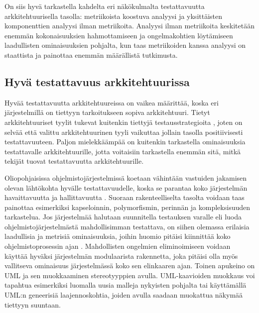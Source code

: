 \documentclass[finnish]{tktltiki2}
\numberwithin{table}{section}
\theoremstyle{definition}
\theoremstyle{remark}
\begin{document}
On siis hyvä tarkastella kahdelta eri näkökulmalta testattavuutta arkkitehtuurisella tasolla: metriikoista koostuva analyysi ja yksittäisten komponenttien analyysi ilman metriikoita. Analyysi ilman metriikoita keskitetään enemmän kokonaisuuksien hahmottamiseen ja ongelmakohtien löytämiseen laadullisten ominaisuuksien pohjalta, kun taas metriikoiden kanssa analyysi on staattista ja painottaa enemmän määrällistä tutkimusta.


\subsection{Hyvä testattavuus arkkitehtuurissa} \label{good_testability}

 
Hyvää testattavuutta arkkitehtuureissa on vaikea määrittää, koska eri järjestelmillä on tiettyyn tarkoitukseen sopiva arkkitehtuuri. Tietyt arkkitehtuuriset tyylit tukevat kuitenkin tiettyjä testausstrategioita \citep{Eickelmann:1996:MOS:243327.243602}, joten on selvää että valittu arkkitehtuurinen tyyli vaikuttaa jollain tasolla positiivisesti testattavuuteen. Paljon mielekkäämpää on kuitenkin tarkastella  ominaisuuksia testattavalle arkkitehtuurille, jotta voitaisiin tarkastella enemmän sitä, mitkä tekijät tuovat testattavuutta arkkitehtuurille.

Oliopohjaisissa ohjelmistojärjestelmissä koetaan vähintään vastuiden jakamisen olevan  lähtökohta hyvälle testattavuudelle, koska se parantaa koko järjestelmän havaittavuutta ja hallittavuutta \citep{Binder:1994:DTO:182987.184077}. Suoraan rakenteelliselta tasolta voidaan taas painottaa esimerkiksi kapseloinnin, polymorfismin, perinnän ja kompleksisuuden tarkastelua. Jos järjestelmää halutaan suunnitella testauksen varalle eli luoda ohjelmistojärjestelmästä mahdollisimman testattava, on siihen olemassa erilaisia laadullisia ja metrisiä ominaisuuksia, joihin huomio pitäisi kiinnittää koko ohjelmistoprosessin ajan \citep{joshi_design_2014}. Mahdollisten ongelmien eliminoimiseen voidaan käyttää hyväksi järjestelmän modulaarista rakennetta, joka pitäisi olla myös vallitseva ominaisuus järjestelmässä koko sen elinkaaren ajan. Toinen apukeino on UML ja sen  muokkaaminen stereotyyppien avulla. UML-kaavioiden muokkaus voi tapahtua esimerkiksi luomalla uusia malleja nykyisten pohjalta tai käyttämällä UML:n geneerisiä laajennoskohtia, joiden avulla saadaan muokattua näkymää tiettyyn suuntaan.


\end{document}
